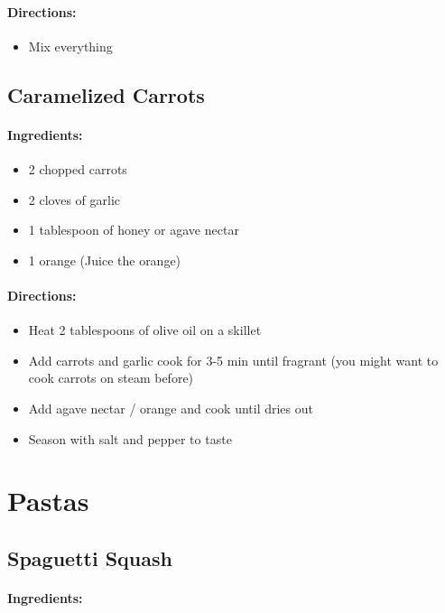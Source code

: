 \documentclass{article}
\begin{document}
\paragraph{Directions:}
\begin{itemize}
	\item Mix everything
\end{itemize}

\subsection{Caramelized Carrots}

\paragraph{Ingredients:}

\begin{itemize}
	\item 2 chopped carrots
	\item 2 cloves of garlic
	\item 1 tablespoon of honey or agave nectar
	\item 1 orange (Juice the orange)
\end{itemize}

\paragraph{Directions:}
\begin{itemize}
	\item  Heat 2 tablespoons of olive oil on a skillet
	\item Add carrots and garlic cook for 3-5 min until fragrant (you might want to cook carrots on steam before)
	\item Add agave nectar / orange and cook until dries out
	\item Season with salt and pepper to taste
\end{itemize}

\section{Pastas}

\subsection{Spaguetti Squash}

\paragraph{Ingredients:}
\end{document}
